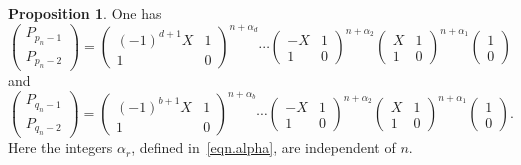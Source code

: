 \documentclass{amsart}
\theoremstyle{definition}
\newtheorem{Proposition}[Theorem]{Proposition}
\begin{document}
\begin{Proposition}\label{description}
One has
$$\begin{pmatrix}P_{p_n-1}\\P_{p_n-2}\end{pmatrix}=\begin{pmatrix}(-1)^{d+1} X& 1 \\ 1 & 0\end{pmatrix}^{n+\alpha_d}\cdots\begin{pmatrix}-X& 1 \\ 1 & 0\end{pmatrix}^{n+\alpha_2}\begin{pmatrix} X& 1 \\ 1 & 0\end{pmatrix}^{n+\alpha_1}\begin{pmatrix} 1 \\ 0\end{pmatrix}$$
and
$$\begin{pmatrix}P_{q_n-1}\\P_{q_n-2}\end{pmatrix}=\begin{pmatrix}(-1)^{b+1} X& 1 \\ 1 & 0\end{pmatrix}^{n+\alpha_b}\cdots\begin{pmatrix}-X& 1 \\ 1 & 0\end{pmatrix}^{n+\alpha_2}\begin{pmatrix}X& 1 \\ 1 & 0\end{pmatrix}^{n+\alpha_1}\begin{pmatrix} 1 \\ 0\end{pmatrix}.$$
Here the integers $\alpha_r$, defined in~\eqref{eqn.alpha}, are independent of $n$.
\end{Proposition}
\end{document}
